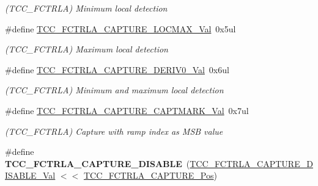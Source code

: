\begin{DoxyCompactItemize}
\begin{DoxyCompactList}\small\item\em (T\+C\+C\+\_\+\+F\+C\+T\+R\+L\+A) Minimum local detection \end{DoxyCompactList}\item 
\hypertarget{group___s_a_m_l21___t_c_c_ga4a99b753c5ef9795a144b200472484da}{}\#define \hyperlink{group___s_a_m_l21___t_c_c_ga4a99b753c5ef9795a144b200472484da}{T\+C\+C\+\_\+\+F\+C\+T\+R\+L\+A\+\_\+\+C\+A\+P\+T\+U\+R\+E\+\_\+\+L\+O\+C\+M\+A\+X\+\_\+\+Val}~0x5ul\label{group___s_a_m_l21___t_c_c_ga4a99b753c5ef9795a144b200472484da}

\begin{DoxyCompactList}\small\item\em (T\+C\+C\+\_\+\+F\+C\+T\+R\+L\+A) Maximum local detection \end{DoxyCompactList}\item 
\hypertarget{group___s_a_m_l21___t_c_c_ga23068d24943345d43d99e77076d3c97b}{}\#define \hyperlink{group___s_a_m_l21___t_c_c_ga23068d24943345d43d99e77076d3c97b}{T\+C\+C\+\_\+\+F\+C\+T\+R\+L\+A\+\_\+\+C\+A\+P\+T\+U\+R\+E\+\_\+\+D\+E\+R\+I\+V0\+\_\+\+Val}~0x6ul\label{group___s_a_m_l21___t_c_c_ga23068d24943345d43d99e77076d3c97b}

\begin{DoxyCompactList}\small\item\em (T\+C\+C\+\_\+\+F\+C\+T\+R\+L\+A) Minimum and maximum local detection \end{DoxyCompactList}\item 
\hypertarget{group___s_a_m_l21___t_c_c_ga2608a689150357111faa054ec7b34bf1}{}\#define \hyperlink{group___s_a_m_l21___t_c_c_ga2608a689150357111faa054ec7b34bf1}{T\+C\+C\+\_\+\+F\+C\+T\+R\+L\+A\+\_\+\+C\+A\+P\+T\+U\+R\+E\+\_\+\+C\+A\+P\+T\+M\+A\+R\+K\+\_\+\+Val}~0x7ul\label{group___s_a_m_l21___t_c_c_ga2608a689150357111faa054ec7b34bf1}

\begin{DoxyCompactList}\small\item\em (T\+C\+C\+\_\+\+F\+C\+T\+R\+L\+A) Capture with ramp index as M\+S\+B value \end{DoxyCompactList}\item 
\hypertarget{group___s_a_m_l21___t_c_c_gac2731c290fede4bc48e05220d3be3164}{}\#define {\bfseries T\+C\+C\+\_\+\+F\+C\+T\+R\+L\+A\+\_\+\+C\+A\+P\+T\+U\+R\+E\+\_\+\+D\+I\+S\+A\+B\+L\+E}~(\hyperlink{group___s_a_m_l21___t_c_c_gad31b55c84d21b43b9ef58769281b6c38}{T\+C\+C\+\_\+\+F\+C\+T\+R\+L\+A\+\_\+\+C\+A\+P\+T\+U\+R\+E\+\_\+\+D\+I\+S\+A\+B\+L\+E\+\_\+\+Val} $<$$<$ \hyperlink{group___s_a_m_l21___t_c_c_ga130a647ff472e004168fd7ec22f13b9d}{T\+C\+C\+\_\+\+F\+C\+T\+R\+L\+A\+\_\+\+C\+A\+P\+T\+U\+R\+E\+\_\+\+Pos})\label{group___s_a_m_l21___t_c_c_gac2731c290fede4bc48e05220d3be3164}


\end{DoxyCompactItemize}

